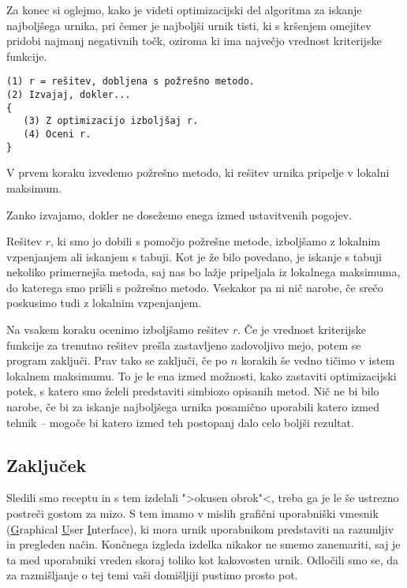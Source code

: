 \documentclass[a4paper,10pt]{article}
\begin{document}
Za konec si oglejmo, kako je videti optimizacijski del algoritma za iskanje najboljšega
urnika, pri čemer je najboljši urnik tisti, ki s kršenjem omejitev pridobi najmanj negativnih
točk, oziroma ki ima največjo vrednost kriterijske funkcije.

\begin {verbatim}
(1) r = rešitev, dobljena s požrešno metodo.
(2) Izvajaj, dokler...
{
   (3) Z optimizacijo izboljšaj r.
   (4) Oceni r.
}
\end{verbatim}

   V prvem koraku izvedemo požrešno metodo, ki rešitev urnika pripelje v lokalni maksimum.

   Zanko izvajamo, dokler ne dosežemo enega izmed ustavitvenih pogojev.

   Rešitev $r$, ki smo jo dobili s pomočjo požrešne metode, izboljšamo z lokalnim vzpenjanjem
   ali iskanjem s tabuji. Kot je že bilo povedano, je iskanje s tabuji nekoliko primernejša metoda,
   saj nas bo lažje pripeljala iz lokalnega maksimuma, do katerega smo prišli s požrešno metodo.
   Vsekakor pa ni nič narobe, če srečo poskusimo tudi z lokalnim vzpenjanjem.

   Na vsakem koraku ocenimo izboljšamo rešitev $r$. Če je vrednost kriterijske funkcije
   za trenutno rešitev prešla zastavljeno zadovoljivo mejo, potem se program zaključi. Prav tako
   se zaključi, če po $n$ korakih še vedno tičimo v istem lokalnem maksimumu.
%
To je le ena izmed možnosti, kako zastaviti optimizacijski potek, s katero smo želeli predstaviti
simbiozo opisanih metod. Nič ne bi bilo narobe, če bi za iskanje najboljšega urnika posamično
uporabili katero izmed tehnik -- mogoče bi katero izmed teh postopanj dalo celo boljši rezultat.

\subsection {Zaključek} %

Sledili smo receptu in s tem izdelali ">okusen obrok"<, treba ga je le še ustrezno postreči
gostom za mizo. S tem imamo v mislih grafični uporabniški vmesnik (\underline{G}raphical
\underline{U}ser \underline{I}nterface), ki mora urnik uporabnikom predstaviti na razumljiv in
pregleden način. Končnega izgleda izdelka nikakor ne smemo zanemariti, saj je ta med uporabniki
vreden skoraj toliko kot kakovosten urnik. Odločili smo se, da za razmišljanje o tej temi vaši
domišljiji pustimo prosto pot.
\end{document}
